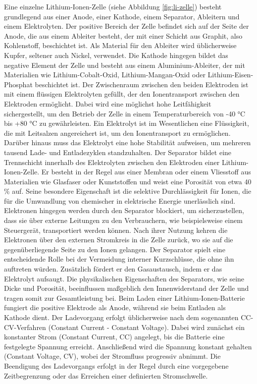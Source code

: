 Eine einzelne Lithium-Ionen-Zelle (siehe Abbildung \ref{fig:li-zelle}) besteht grundlegend aus einer Anode, einer Kathode, einem Separator, Ableitern und einem Elektrolyten. Der positive Bereich der Zelle befindet sich auf der Seite der Anode, die aus einem Ableiter besteht, der mit einer Schicht aus Graphit, also Kohlenstoff, beschichtet ist. Als Material für den Ableiter wird üblicherweise Kupfer, seltener auch Nickel, verwendet. Die Kathode hingegen bildet das negative Element der Zelle und besteht aus einem Aluminium-Ableiter, der mit Materialien wie Lithium-Cobalt-Oxid, Lithium-Mangan-Oxid oder Lithium-Eisen-Phosphat beschichtet ist. Der Zwischenraum zwischen den beiden Elektroden ist mit einem flüssigen Elektrolyten gefüllt, der den Ionentransport zwischen den Elektroden ermöglicht. Dabei wird eine möglichst hohe Leitfähigkeit sichergestellt, um den Betrieb der Zelle in einem Temperaturbereich von -40 °C bis +80 °C zu gewährleisten. \autocite{Lith-Akku}
Ein Elektrolyt ist im Wesentlichen eine Flüssigkeit, die mit Leitsalzen angereichert ist, um den Ionentransport zu ermöglichen. Darüber hinaus muss das Elektrolyt eine hohe Stabilität aufweisen, um mehreren tausend Lade- und Entladezyklen standzuhalten. \autocite[S.61f.]{Korthauer.2013}
Der Separator bildet eine Trennschicht innerhalb des Elektrolyten zwischen den Elektroden einer Lithium-Ionen-Zelle. Er besteht in der Regel aus einer Membran oder einem Vliesstoff aus Materialien wie Glasfaser oder Kunststoffen und weist eine Porosität von etwa 40 \% auf. Seine besondere Eigenschaft ist die selektive Durchlässigkeit für Ionen, die für die Umwandlung von chemischer in elektrische Energie unerlässlich sind. Elektronen hingegen werden durch den Separator blockiert, um sicherzustellen, dass sie über externe Leitungen zu den Verbrauchern, wie beispielsweise einem Steuergerät, transportiert werden können. Nach ihrer Nutzung kehren die Elektronen über den externen Stromkreis in die Zelle zurück, wo sie auf die gegenüberliegende Seite zu den Ionen gelangen. \newline \autocite[S. 80]{Korthauer.2013}
Der Separator spielt eine entscheidende Rolle bei der Vermeidung interner Kurzschlüsse, die ohne ihn auftreten würden. Zusätzlich fördert er den Gasaustausch, indem er das Elektrolyt aufsaugt. Die physikalischen Eigenschaften des Separators, wie seine Dicke und Porosität, beeinflussen maßgeblich den Innenwiderstand der Zelle und tragen somit zur Gesamtleistung bei. \autocite[S. 80]{Korthauer.2013}
Beim Laden einer Lithium-Ionen-Batterie fungiert die positive Elektrode als Anode, während sie beim Entladen als Kathode dient. Der Ladevorgang erfolgt üblicherweise nach dem sogenannten CC-CV-Verfahren (Constant Current - Constant Voltage). Dabei wird zunächst ein konstanter Strom (Constant Current, CC) angelegt, bis die Batterie eine festgelegte Spannung erreicht. Anschließend wird die Spannung konstant gehalten (Constant Voltage, CV), wobei der Stromfluss progressiv abnimmt. Die Beendigung des Ladevorgangs erfolgt in der Regel durch eine vorgegebene Zeitbegrenzung oder das Erreichen einer definierten Stromschwelle. \autocite[S. 15]{Korthauer.2013}
